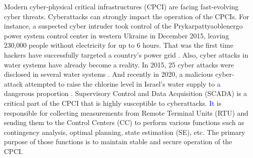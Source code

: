 
Modern cyber-physical critical infrastructures (CPCI) are facing fast-evolving cyber threats. Cyberattacks can strongly impact the operation of the CPCIs. For instance, a suspected cyber intruder took control of the Prykarpattyaoblenergo power system control center in western Ukraine in December 2015, leaving 230,000 people without electricity for up to 6 hours. That was the first time hackers have successfully targeted a country's power grid \cite{liang20162015}. Also, cyber attacks in water systems have already become a reality. In 2015, 25 cyber attacks were disclosed in several water systems \cite{clark2017protecting}. And recently in 2020, a malicious cyber-attack attempted to raise the chlorine level in Israel's water supply to \textcolor{blue}{a} dangerous proportion \cite{brentan2021cyber}. Supervisory Control and Data Acquisition (SCADA) is a critical part of the CPCI that is highly susceptible to cyberattacks. \textcolor{blue}{It} is responsible for collecting measurements from Remote Terminal Units (RTU) and sending them to the Control Centers (CC) to perform various functions such as contingency analysis, optimal planning, state estimation (SE), etc. The primary purpose of those functions is to maintain stable and secure operation of the CPCI. 

